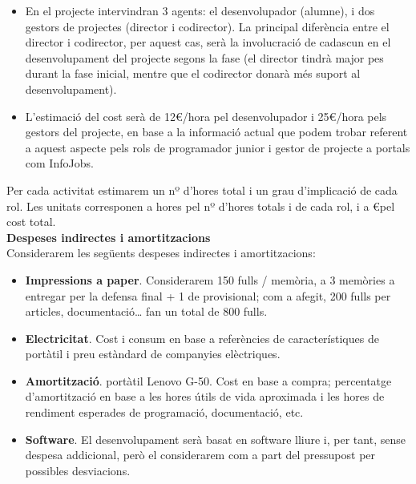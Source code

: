 \begin{itemize}
\item En el projecte intervindran 3 agents: el desenvolupador (alumne), i dos gestors de projectes (director i codirector). La principal diferència entre el director i codirector, per aquest cas, serà la involucració de cadascun en el desenvolupament del projecte segons la fase (el director tindrà major pes durant la fase inicial, mentre que el codirector donarà més suport al desenvolupament).
\item L’estimació del cost serà de 12\euro /hora pel desenvolupador i 25\euro /hora pels gestors del projecte, en base a la informació actual que podem trobar referent a aquest aspecte pels rols de programador junior i gestor de projecte a portals com InfoJobs.
\end{itemize}

Per cada activitat estimarem un nº d’hores total i un grau d’implicació de cada rol. Les unitats corresponen a hores pel nº d’hores totals i de cada rol, i a \euro pel cost total.\\

\noindent \textbf{\large Despeses indirectes i amortitzacions}\\

\noindent Considerarem les següents despeses indirectes i amortitzacions:

\begin{itemize}
\item \textbf{Impressions a paper}. Considerarem 150 fulls / memòria, a 3 memòries a entregar per la defensa final + 1 de provisional; com a afegit, 200 fulls per articles, documentació… fan un total de 800 fulls.
\item \textbf{Electricitat}. Cost i consum en base a referències de característiques de portàtil i preu estàndard de companyies elèctriques.
\item \textbf{Amortització}. portàtil Lenovo G-50. Cost en base a compra; percentatge d’amortització en base a les hores útils de vida aproximada i les hores de rendiment esperades de programació, documentació, etc.
\item \textbf{Software}. El desenvolupament serà basat en software lliure i, per tant, sense despesa addicional, però el considerarem com a part del pressupost per possibles desviacions.
\end{itemize}

